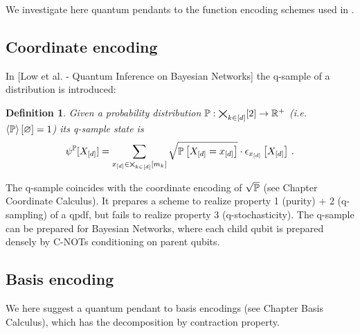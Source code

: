 \documentclass[aps,onecolumn,nofootinbib,pra]{article}
\newtheorem{definition}{Definition}
\begin{document}
    We investigate here quantum pendants to the function encoding schemes used in \tnreason.

    \subsection{Coordinate encoding}

    In [Low et al. - Quantum Inference on Bayesian Networks] the q-sample of a distribution is introduced:

    \begin{definition}
        Given a probability distribution $\mathbb{P}:\bigtimes_{k\in[d]}[2]\rightarrow\mathbb{R}^+$ (i.e. $\left\langle \mathbb{P}\right\rangle \left[ \varnothing \right]=1$) its q-sample state is
        \begin{align*}
            \psi^{\mathbb{P}}[X_{[d]}] = \sum_{x_{[d]}\in\bigtimes_{k\in[d]}[m_{k}]} \sqrt{\mathbb{P}\left[X_{[d]}=x_{[d]}\right]} \cdot \epsilon_{x_{[d]}}\left[X_{[d]}\right] \, .
        \end{align*}
    \end{definition}

    The q-sample coincides with the coordinate encoding of $\sqrt{\mathbb{P}}$ (see Chapter Coordinate Calculus).
    It prepares a scheme to realize property 1 (purity) + 2 (q-sampling) of a qpdf, but fails to realize property 3 (q-stochasticity).
    The q-sample can be prepared for Bayesian Networks, where each child qubit is prepared densely by C-NOTs conditioning on parent qubits.

    \subsection{Basis encoding}

    We here suggest a quantum pendant to basis encodings (see Chapter Basis Calculus), which has the decomposition by contraction property.
\end{document}
